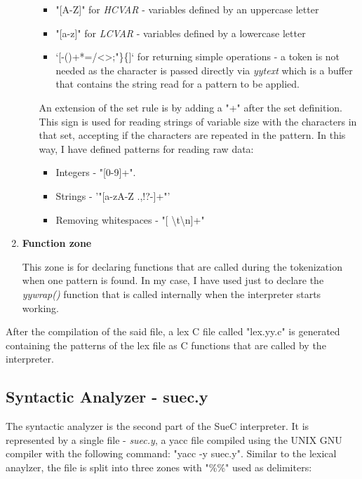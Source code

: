 \documentclass[12pt,a4paper,twoside]{report}
\begin{document}
\begin{enumerate}
\begin{itemize}
	\begin{itemize}
		\item "[A-Z]" for \textit{HCVAR} - variables defined by an uppercase letter
		\item "[a-z]" for \textit{LCVAR} - variables defined by a lowercase letter
		\item `[-()+*=/<>;"\}\{]` for returning simple operations - a token is not needed as the character is passed directly via \textit{yytext} which is a buffer that contains the string read for a pattern to be applied.
	\end{itemize}	
	
	An extension of the set rule is by adding a "+" after the set definition. This sign is used for reading strings of variable size with the characters in that set, accepting if the characters are repeated in the pattern. In this way, I have defined patterns for reading raw data:
	\begin{itemize}
		\item Integers - "[0-9]+".
		\item Strings - '"[a-zA-Z .,!?-]+"'
		\item Removing whitespaces - "[ \textbackslash t\textbackslash n]+"
	\end{itemize}
	\end{itemize}
	\item \textbf{Function zone}
	
	This zone is for declaring functions that are called during the tokenization when one pattern is found. In my case, I have used just to declare the \textit{yywrap()} function that is called internally when the interpreter starts working. 
\end{enumerate}

After the compilation of the said file, a lex C file called "lex.yy.c" is generated containing the patterns of the lex file as C functions that are called by the interpreter. 
\subsection{Syntactic Analyzer - suec.y}

The syntactic analyzer is the second part of the SueC interpreter. It is represented by a single file - \textit{suec.y}, a yacc file compiled using the UNIX GNU compiler with the following command: "yacc -y suec.y". Similar to the lexical anaylzer, the file is split into three zones with "\%\%" used as delimiters:
\end{document}
